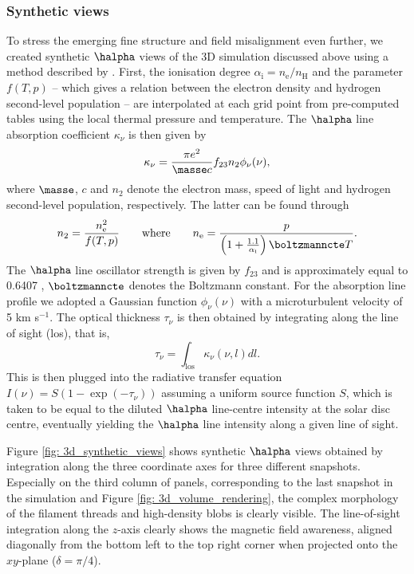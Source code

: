 \subsubsection{Synthetic views}
To stress the emerging fine structure and field misalignment even further, we created synthetic $\halpha$ views of the 3D simulation discussed above using a method described by \citet{heinzel2015}. First, the ionisation degree $\alpha_\text{i} = n_\text{e}/n_\text{H}$ and the parameter $f(T, p)$ -- which gives a relation between the electron density and hydrogen second-level population -- are interpolated at each grid point from pre-computed tables using the local thermal pressure and temperature. The $\halpha$ line absorption coefficient $\kappa_\nu$ is then given by
\begin{equation}
  \kappa_\nu = \frac{\pi e^2}{\masse c}f_{23}n_2 \phi_\nu(\nu),
\end{equation}
where $\masse$, $c$ and $n_2$ denote the electron mass, speed of light and hydrogen second-level population, respectively. The latter can be found through
\begin{equation}
  n_2 = \frac{n_\text{e}^2}{f(T, p)}
  \qquad \text{where} \qquad
  n_\text{e} = \frac{p}{\left(1 + \frac{1.1}{\alpha_\text{i}}\right)\boltzmanncte T}.
\end{equation}
The $\halpha$ line oscillator strength is given by $f_{23}$ and is approximately equal to 0.6407 \citep{goldwire1968}, $\boltzmanncte$ denotes the Boltzmann constant. For the absorption line profile we adopted a Gaussian function
$\phi_\nu(\nu)$ with a microturbulent velocity of 5 km s$^{-1}$. The optical thickness $\tau_\nu$ is then obtained by integrating along the line of sight (los), that is,
\begin{equation}
  \tau_\nu = \int_{\text{los}}\kappa_\nu(\nu, l)dl.
\end{equation}
This is then plugged into the radiative transfer equation $I(\nu) = S(1 - \exp(-\tau_\nu))$ assuming a uniform source function $S$, which is taken to be equal to the diluted $\halpha$ line-centre intensity at the solar disc centre, eventually yielding the $\halpha$ line intensity along a given line of sight.

Figure \ref{fig: 3d_synthetic_views} shows synthetic $\halpha$ views obtained by integration along the three coordinate axes for three different snapshots. Especially on the third column of panels, corresponding to the last snapshot in the simulation and Figure \ref{fig: 3d_volume_rendering}, the complex morphology of the filament threads and high-density blobs is clearly visible. The line-of-sight integration along the $z$-axis clearly shows the magnetic field awareness, aligned diagonally from the bottom left to the top right corner when projected onto the $xy$-plane ($\delta = \pi/4$).

